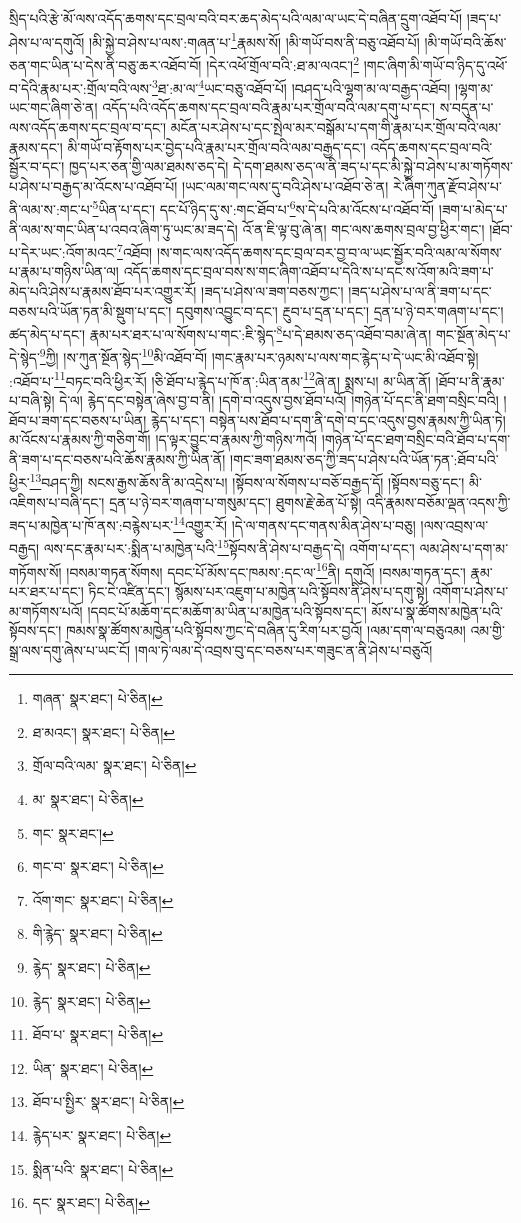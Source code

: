 སྲིད་པའི་རྩེ་མོ་ལས་འདོད་ཆགས་དང་བྲལ་བའི་བར་ཆད་མེད་པའི་ལམ་ལ་ཡང་དེ་བཞིན་དྲུག་འཐོབ་པོ། །ཟད་པ་ཤེས་པ་ལ་དགུའོ། །མི་སྐྱེ་བ་ཤེས་པ་ལས་:གཞན་པ་\footnote{གཞན་  སྣར་ཐང་།  པེ་ཅིན། }རྣམས་སོ། །མི་གཡོ་བས་ནི་བཅུ་འཐོབ་པོ། །མི་གཡོ་བའི་ཆོས་ཅན་གང་ཡིན་པ་དེས་ནི་བཅུ་ཆར་འཐོབ་བོ། །དེར་འཕོ་གྲོལ་བའི་:ཐ་མ་ལའང་།\footnote{ཐ་མའང་།  སྣར་ཐང་།  པེ་ཅིན། } །གང་ཞིག་མི་གཡོ་བ་ཉིད་དུ་འཕོ་བ་དེའི་རྣམ་པར་:གྲོལ་བའི་ལས་\footnote{གྲོལ་བའི་ལམ་  སྣར་ཐང་།  པེ་ཅིན། }ཐ་:མ་ལ་\footnote{མ་  སྣར་ཐང་།  པེ་ཅིན། }ཡང་བཅུ་འཐོབ་པོ། །བཤད་པའི་ལྷག་མ་ལ་བརྒྱད་འཐོབ། །ལྷག་མ་ཡང་གང་ཞིག་ཅེ་ན། འདོད་པའི་འདོད་ཆགས་དང་བྲལ་བའི་རྣམ་པར་གྲོལ་བའི་ལམ་དགུ་པ་དང་། ས་བདུན་པ་ལས་འདོད་ཆགས་དང་བྲལ་བ་དང་། མངོན་པར་ཤེས་པ་དང་སྤེལ་མར་བསྒོམ་པ་དག་གི་རྣམ་པར་གྲོལ་བའི་ལམ་རྣམས་དང་། མི་གཡོ་བ་རྟོགས་པར་བྱེད་པའི་རྣམ་པར་གྲོལ་བའི་ལམ་བརྒྱད་དང་། འདོད་ཆགས་དང་བྲལ་བའི་སྦྱོར་བ་དང་། ཁྱད་པར་ཅན་གྱི་ལམ་ཐམས་ཅད་དེ། དེ་དག་ཐམས་ཅད་ལ་ནི་ཟད་པ་དང་མི་སྐྱེ་བ་ཤེས་པ་མ་གཏོགས་པ་ཤེས་པ་བརྒྱད་མ་འོངས་པ་འཐོབ་པོ། །ཡང་ལམ་གང་ལས་དུ་བའི་ཤེས་པ་འཐོབ་ཅེ་ན། རེ་ཞིག་ཀུན་རྫོབ་ཤེས་པ་ནི་ལམ་ས་:གང་པ་\footnote{གང་  སྣར་ཐང་། }ཡིན་པ་དང་། དང་པོ་ཉིད་དུ་ས་:གང་ཐོབ་པ་\footnote{གང་བ་  སྣར་ཐང་།  པེ་ཅིན། }ས་དེ་པའི་མ་འོངས་པ་འཐོབ་བོ། །ཟག་པ་མེད་པ་ནི་ལམ་ས་གང་ཡིན་པ་འབའ་ཞིག་ཏུ་ཡང་མ་ཟད་དེ། འོ་ན་ཇི་ལྟ་བུ་ཞེ་ན། གང་ལས་ཆགས་བྲལ་བྱ་ཕྱིར་གང་། །ཐོབ་པ་དེར་ཡང་:འོག་མའང་\footnote{འོག་གང་  སྣར་ཐང་།  པེ་ཅིན། }འཐོབ། །ས་གང་ལས་འདོད་ཆགས་དང་བྲལ་བར་བྱ་བ་ལ་ཡང་སྦྱོར་བའི་ལམ་ལ་སོགས་པ་རྣམ་པ་གཉིས་ཡིན་ལ། འདོད་ཆགས་དང་བྲལ་བས་ས་གང་ཞིག་འཐོབ་པ་དེའི་ས་པ་དང་ས་འོག་མའི་ཟག་པ་མེད་པའི་ཤེས་པ་རྣམས་ཐོབ་པར་འགྱུར་རོ། །ཟད་པ་ཤེས་ལ་ཟག་བཅས་ཀྱང་། །ཟད་པ་ཤེས་པ་ལ་ནི་ཟག་པ་དང་བཅས་པའི་ཡོན་ཏན་མི་སྡུག་པ་དང་། དབུགས་འབྱུང་བ་དང་། རྔུབ་པ་དྲན་པ་དང་། དྲན་པ་ཉེ་བར་གཞག་པ་དང་། ཚད་མེད་པ་དང་། རྣམ་པར་ཐར་པ་ལ་སོགས་པ་གང་:ཇི་སྙེད་\footnote{གི་རྙེད་  སྣར་ཐང་།  པེ་ཅིན། }པ་དེ་ཐམས་ཅད་འཐོབ་བམ་ཞེ་ན། གང་སྔོན་མེད་པ་དེ་སྙེད་\footnote{རྙེད་  སྣར་ཐང་།  པེ་ཅིན། }ཀྱི། །ས་ཀུན་སྔོན་སྙེད་\footnote{རྙེད་  སྣར་ཐང་།  པེ་ཅིན། }མི་འཐོབ་བོ། །གང་རྣམ་པར་ཉམས་པ་ལས་གང་རྙེད་པ་དེ་ཡང་མི་འཐོབ་སྟེ། :འཐོབ་པ་\footnote{ཐོབ་པ་  སྣར་ཐང་།  པེ་ཅིན། }བཏང་བའི་ཕྱིར་རོ། །ཅི་ཐོབ་པ་རྙེད་པ་ཁོ་ན་:ཡིན་ནམ་\footnote{ཡིན་  སྣར་ཐང་།  པེ་ཅིན། }ཞེ་ན། སྨྲས་པ། མ་ཡིན་ནོ། །ཐོབ་པ་ནི་རྣམ་པ་བཞི་སྟེ། དེ་ལ། རྙེད་དང་བསྟེན་ཞེས་བྱ་བ་ནི། །དགེ་བ་འདུས་བྱས་ཐོབ་པའོ། །གཉེན་པོ་དང་ནི་ཐག་བསྲིང་བའི། །ཐོབ་པ་ཟག་དང་བཅས་པ་ཡིན། རྙེད་པ་དང་། བསྟེན་པས་ཐོབ་པ་དག་ནི་དགེ་བ་དང་འདུས་བྱས་རྣམས་ཀྱི་ཡིན་ཏེ། མ་འོངས་པ་རྣམས་ཀྱི་གཅིག་གོ། །ད་ལྟར་བྱུང་བ་རྣམས་ཀྱི་གཉིས་ཀའོ། །གཉེན་པོ་དང་ཐག་བསྲིང་བའི་ཐོབ་པ་དག་ནི་ཟག་པ་དང་བཅས་པའི་ཆོས་རྣམས་ཀྱི་ཡིན་ནོ། །གང་ཟག་ཐམས་ཅད་ཀྱི་ཟད་པ་ཤེས་པའི་ཡོན་ཏན་:ཐོབ་པའི་ཕྱིར་\footnote{ཐོབ་པ་སྤྱིར་  སྣར་ཐང་།  པེ་ཅིན། }བཤད་ཀྱི། སངས་རྒྱས་ཆོས་ནི་མ་འདྲེས་པ། །སྟོབས་ལ་སོགས་པ་བཅོ་བརྒྱད་དོ། །སྟོབས་བཅུ་དང་། མི་འཇིགས་པ་བཞི་དང་། དྲན་པ་ཉེ་བར་གཞག་པ་གསུམ་དང་། ཐུགས་རྗེ་ཆེན་པོ་སྟེ། འདི་རྣམས་བཅོམ་ལྡན་འདས་ཀྱི་ཟད་པ་མཁྱེན་པ་ཁོ་ནས་:བརྙེས་པར་\footnote{རྙེད་པར་  སྣར་ཐང་།  པེ་ཅིན། }འགྱུར་རོ། །དེ་ལ་གནས་དང་གནས་མིན་ཤེས་པ་བཅུ། །ལས་འབྲས་ལ་བརྒྱད། ལས་དང་རྣམ་པར་:སྨིན་པ་མཁྱེན་པའི་\footnote{སྨིན་པའི་  སྣར་ཐང་།  པེ་ཅིན། }སྟོབས་ནི་ཤེས་པ་བརྒྱད་དེ། འགོག་པ་དང་། ལམ་ཤེས་པ་དག་མ་གཏོགས་སོ། །བསམ་གཏན་སོགས། དབང་པོ་མོས་དང་ཁམས་:དང་ལ་\footnote{དང་  སྣར་ཐང་།  པེ་ཅིན། }ནི། དགུའོ། །བསམ་གཏན་དང་། རྣམ་པར་ཐར་པ་དང་། ཏིང་ངེ་འཛིན་དང་། སྙོམས་པར་འཇུག་པ་མཁྱེན་པའི་སྟོབས་ནི་ཤེས་པ་དགུ་སྟེ། འགོག་པ་ཤེས་པ་མ་གཏོགས་པའོ། །དབང་པོ་མཆོག་དང་མཆོག་མ་ཡིན་པ་མཁྱེན་པའི་སྟོབས་དང་། མོས་པ་སྣ་ཚོགས་མཁྱེན་པའི་སྟོབས་དང་། ཁམས་སྣ་ཚོགས་མཁྱེན་པའི་སྟོབས་ཀྱང་དེ་བཞིན་དུ་རིག་པར་བྱའོ། །ལམ་དག་ལ་བཅུའམ། འམ་གྱི་སྒྲ་ལས་དགུ་ཞེས་པ་ཡང་ངོ། །གལ་ཏེ་ལམ་དེ་འབྲས་བུ་དང་བཅས་པར་གཟུང་ན་ནི་ཤེས་པ་བཅུའོ། 